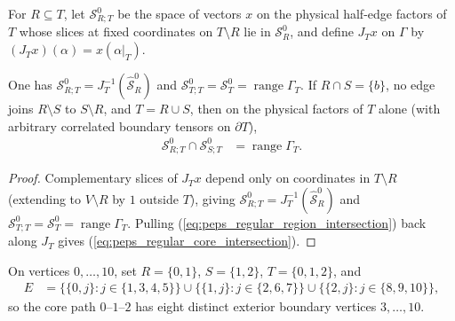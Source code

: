 \begin{definition}%
    \label{def:peps_regular_core_slice_range}
    \leanok
    For $R\subseteq T$, let $\mathcal S_{R;T}^0$ be the space of vectors
    $x$ on the physical half-edge factors of $T$ whose slices at fixed
    coordinates on $T\setminus R$ lie in $\mathcal S_R^0$, and define
    $J_Tx$ on $\Gamma$ by $(J_Tx)(\alpha)=x(\alpha|_T)$.
\end{definition}

\begin{lemma}%
    \label{thm:peps_regular_core_intersection}
    \leanok
    One has $\mathcal S_{R;T}^0=J_T^{-1}(\widehat{\mathcal S}_R^0)$ and
    $\mathcal S_{T;T}^0=\mathcal S_T^0=\operatorname{range}\Gamma_T$.
    If $R\cap S=\{b\}$, no edge joins $R\setminus S$ to $S\setminus R$,
    and $T=R\cup S$, then on the physical factors of $T$ alone (with
    arbitrary correlated boundary tensors on $\partial T$),
    \begin{align}
        \mathcal S_{R;T}^0\cap\mathcal S_{S;T}^0
         & =\operatorname{range}\Gamma_T.
        \label{eq:peps_regular_core_intersection}
    \end{align}
\end{lemma}
\begin{proof}\leanok
    Complementary slices of $J_Tx$ depend only on coordinates in
    $T\setminus R$ (extending to $V\setminus R$ by $1$ outside $T$),
    giving $\mathcal S_{R;T}^0=J_T^{-1}(\widehat{\mathcal S}_R^0)$ and
    $\mathcal S_{T;T}^0=\mathcal S_T^0=\operatorname{range}\Gamma_T$.
    Pulling (\ref{eq:peps_regular_region_intersection}) back along $J_T$
    gives (\ref{eq:peps_regular_core_intersection}).
\end{proof}

\begin{definition}%
    \label{def:peps_regular_three_block_geometry}
    \leanok
    On vertices $0,\ldots,10$, set $R=\{0,1\}$, $S=\{1,2\}$,
    $T=\{0,1,2\}$, and
    \begin{align}
        E & =\{\{0,j\}:j\in\{1,3,4,5\}\}\cup
        \{\{1,j\}:j\in\{2,6,7\}\}\cup
        \{\{2,j\}:j\in\{8,9,10\}\},
        \label{eq:peps_three_block_edges}
    \end{align}
    so the core path $0$--$1$--$2$ has eight distinct exterior boundary
    vertices $3,\ldots,10$.
\end{definition}

